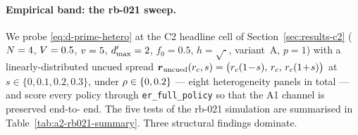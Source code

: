 \paragraph{Empirical band: the rb-021 sweep.}
We probe \eqref{eq:d-prime-hetero} at the C2 headline cell of
Section~\ref{sec:results-c2} ($N = 4$, $V = 0.5$,
$v = 5$, $d'_{\max} = 2$, $f_0 = 0.5$, $h = \sqrt{\cdot}$,
variant~A, $p = 1$) with a linearly-distributed uncued spread
$\boldsymbol{r}_{\mathrm{uncued}}(r_c, s) =
\bigl(r_c(1\!-\!s),\,r_c,\,r_c(1\!+\!s)\bigr)$ at
$s \in \{0, 0.1, 0.2, 0.3\}$, under $\rho \in \{0, 0.2\}$ — eight
heterogeneity panels in total — and score every policy through
\texttt{er\_full\_policy} so that the A1 channel is preserved end-to-
end. The five tests of the rb-021 simulation are summarised in
Table~\ref{tab:a2-rb021-summary}. Three structural findings dominate.

